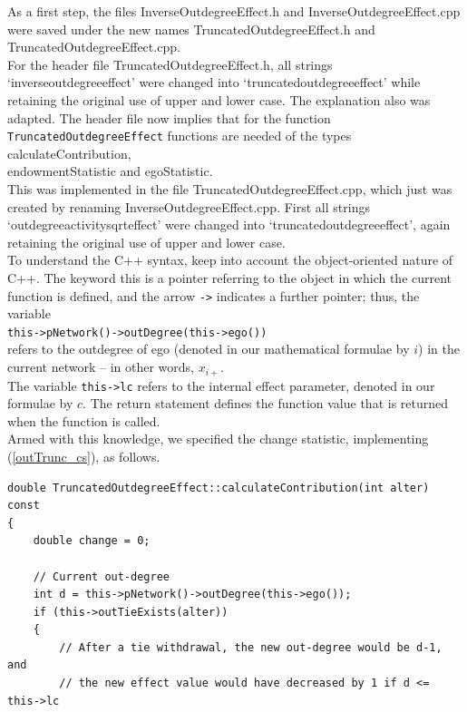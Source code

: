 \documentclass[a4paper,fleqn,11pt]{article}
\newcommand{\+}{\, + \,}
\newcommand{\sfn}[1]{\textsf{#1}}
\begin{document}
{\begin{enumerate}
      As a first step,   the files \textsf{InverseOutdegreeEffect.h} and
      \textsf{InverseOutdegreeEffect.cpp} were saved under the new names
      \textsf{TruncatedOutdegreeEffect.h} and
      \textsf{TruncatedOutdegreeEffect.cpp}.
      \\
      For the header file \textsf{TruncatedOutdegreeEffect.h}, all strings
      `inverseoutdegreeeffect'
      were changed into `truncatedoutdegreeeffect' while retaining the original
      use of upper and lower case.
      The explanation also was adapted.
      The header file now implies that for the function
      \texttt{TruncatedOutdegreeEffect}
      functions are needed of the types \sfn{calculateContribution},\\
      \sfn{endowmentStatistic} and \sfn{egoStatistic}.
      \\
      This was implemented in the file \textsf{TruncatedOutdegreeEffect.cpp},
      which just was created by renaming \textsf{InverseOutdegreeEffect.cpp}.
      First  all strings `outdegreeactivitysqrteffect'
      were changed into `truncatedoutdegreeeffect', again retaining the original
      use of upper and lower case.\\
      To understand the C++ syntax, keep into account
      the object-oriented nature of C++.
      The keyword \sfn{this} is a pointer referring to the object
      in which the current function is defined, and the arrow \texttt{->}
      indicates a further pointer; thus, the variable\\
      \texttt{this->pNetwork()->outDegree(this->ego())}\\
      refers to the outdegree of ego (denoted in our mathematical
      formulae by $i$) in the current network -- in other words,
      $x_{i+}$.\\
      The variable \texttt{this->lc} refers to the
      internal effect parameter, denoted in our formulae by $c$.
      The \sfn{return} statement defines the function value that is returned
      when the function is called.
      \\
      Armed with this knowledge, we specified the change statistic,
      implementing (\ref{outTrunc_cs}), as follows.

{\small
\begin{verbatim}
double TruncatedOutdegreeEffect::calculateContribution(int alter) const
{
    double change = 0;

    // Current out-degree
    int d =	this->pNetwork()->outDegree(this->ego());
    if (this->outTieExists(alter))
    {
        // After a tie withdrawal, the new out-degree would be d-1, and
        // the new effect value would have decreased by 1 if d <= this->lc


\end{verbatim}}
\end{enumerate}}
\end{document}

